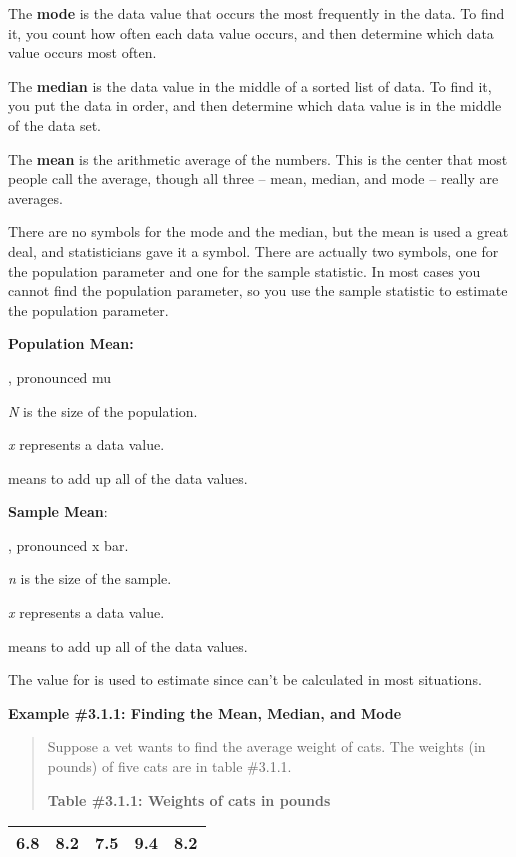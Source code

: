 \documentclass[]{book}
\begin{document}
The \textbf{mode} is the data value that occurs the most frequently in the data. To find it, you count how often each data value occurs, and then determine which data value occurs most often.

The \textbf{median} is the data value in the middle of a sorted list of data. To find it, you put the data in order, and then determine which data value is in the middle of the data set.

The \textbf{mean} is the arithmetic average of the numbers. This is the center that most people call the average, though all three -- mean, median, and mode -- really are averages.

There are no symbols for the mode and the median, but the mean is used a great deal, and statisticians gave it a symbol. There are actually two symbols, one for the population parameter and one for the sample statistic. In most cases you cannot find the population parameter, so you use the sample statistic to estimate the population parameter.

\textbf{Population Mean:}

, pronounced mu

\emph{N} is the size of the population.

\emph{x} represents a data value.

means to add up all of the data values.

\textbf{Sample Mean}:

, pronounced x bar.

\emph{n} is the size of the sample.

\emph{x} represents a data value.

means to add up all of the data values.

The value for is used to estimate since can't be calculated in most
situations.

\textbf{Example \#3.1.1: Finding the Mean, Median, and Mode}

\begin{quote}
Suppose a vet wants to find the average weight of cats. The weights
(in pounds) of five cats are in table \#3.1.1.

\textbf{Table \#3.1.1: Weights of cats in pounds}
\end{quote}

\begin{longtable}[]{@{}lllll@{}}
\toprule
\endhead
6.8 & 8.2 & 7.5 & 9.4 & 8.2\tabularnewline
\bottomrule
\end{longtable}
\end{document}
